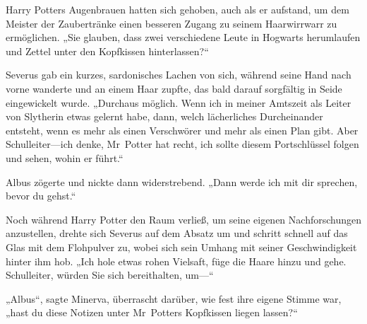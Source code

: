 Harry Potters Augenbrauen hatten sich gehoben, auch als er aufstand, um dem Meister der Zaubertränke einen besseren Zugang zu seinem Haarwirrwarr zu ermöglichen.
„Sie glauben, dass zwei verschiedene Leute in Hogwarts herumlaufen und Zettel unter den Kopfkissen hinterlassen?“

Severus gab ein kurzes, sardonisches Lachen von sich, während seine Hand nach vorne wanderte und an einem Haar zupfte, das bald darauf sorgfältig in Seide eingewickelt wurde.
„Durchaus möglich. Wenn ich in meiner Amtszeit als Leiter von Slytherin etwas gelernt habe, dann, welch lächerliches Durcheinander entsteht, wenn es mehr als einen Verschwörer und mehr als einen Plan gibt. Aber Schulleiter—ich denke, Mr~Potter hat recht, ich sollte diesem Portschlüssel folgen und sehen, wohin er führt.“

Albus zögerte und nickte dann widerstrebend.
„Dann werde ich mit dir sprechen, bevor du gehst.“

\later

Noch während Harry Potter den Raum verließ, um seine eigenen Nachforschungen anzustellen, drehte sich Severus auf dem Absatz um und schritt schnell auf das Glas mit dem Flohpulver zu, wobei sich sein Umhang mit seiner Geschwindigkeit hinter ihm hob.
„Ich hole etwas rohen Vielsaft, füge die Haare hinzu und gehe. Schulleiter, würden Sie sich bereithalten, um—“

„Albus“, sagte Minerva, überrascht darüber, wie fest ihre eigene Stimme war, „hast du diese Notizen unter Mr~Potters Kopfkissen liegen lassen?“

